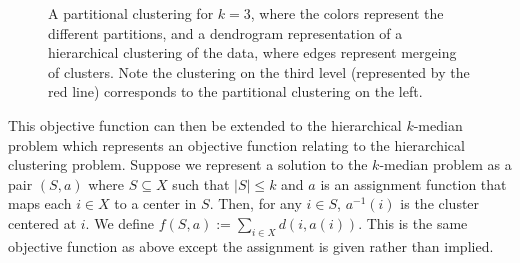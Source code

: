 \documentclass[conference, 10pt, final]{IEEEtran}
\begin{document}
\begin{figure}[!]
\centerline{
\hfil
{}}
\caption{A partitional clustering for $k=3$, where the colors represent the different partitions, and a dendrogram representation of a hierarchical clustering of the data, where edges represent mergeing of clusters.  Note the clustering on the third level (represented by the red line) corresponds to the partitional clustering on the left.}
\end{figure}

This objective function can then be extended to the hierarchical $k$-median problem which represents an objective function relating to the hierarchical clustering problem. Suppose we represent a solution to the $k$-median problem as a pair $(S, a)$ where $S \subseteq X$ such that $|S| \leq k$ and $a$ is an assignment function that maps each $i \in X$ to a center in $S$. Then, for any $i \in S$, $a^{-1}(i)$ is the cluster centered at $i$. We define $f(S,a) := \sum_{i \in X} d(i, a(i))$. This is the same objective function as above except the assignment is given rather than implied.
\end{document}
